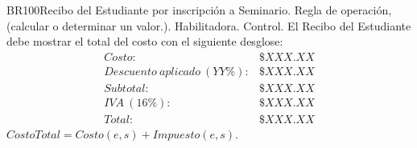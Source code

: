 \begin{BussinesRule}{BR100}{Recibo del Estudiante por inscripción a Seminario.}
	\BRitem[Tipo:] Regla de operación, (calcular o determinar un valor.).
	\BRitem[Clase:] Habilitadora.
	\BRitem[Nivel:] Control. %
	\BRitem[Descripción:] El  Recibo del Estudiante debe mostrar el total del costo con el siguiente desglose:
	\begin{displaymath}\begin{array}{lr}
			Costo:                     & \$ XXX.XX \\
			Descuento~aplicado~(YY\%): & \$ XXX.XX \\
			Subtotal:                  & \$ XXX.XX \\
			IVA~(16\%):                & \$ XXX.XX \\\hline
			Total:                     & \$ XXX.XX
		\end{array}\end{displaymath}
	\BRitem[Sentencia:] $CostoTotal = Costo(e, s) + Impuesto(e, s)$.


\end{BussinesRule}

